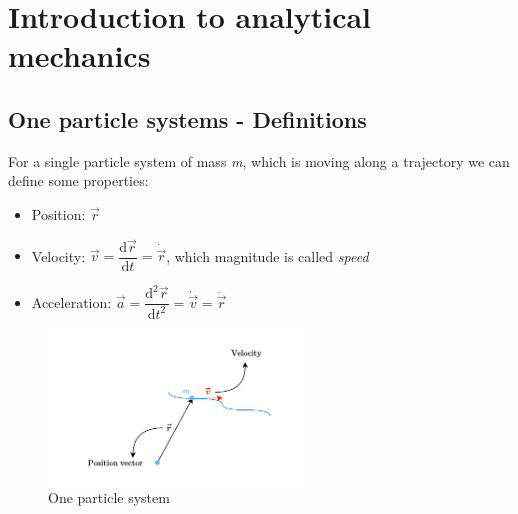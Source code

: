 \chapter{Introduction to analytical mechanics}
\section{One particle systems - Definitions}
For a single particle system of mass \textit{m}, which is moving along a trajectory we can define some properties:
\begin{itemize}
    \item Position: $\vec{r}$
    \item Velocity: $\vec{v} = \dfrac{\mathrm{d} \vec{r}}{\mathrm{d} t}=\dot{\vec{r}}$, which magnitude is called \textit{speed}
    \item Acceleration: $\vec{a}=\dfrac{\mathrm{d}^2 \vec{r}}{\mathrm{d} t^2}=\dot{\vec{v}}=\ddot{\vec{r}}$
\end{itemize}
\begin{figure}[!ht]
    \centering
    \includegraphics[width=0.6\textwidth]{res/svg/onepartsys.drawio}
    \caption{One particle system}
    \label{fig:image1}
\end{figure}

